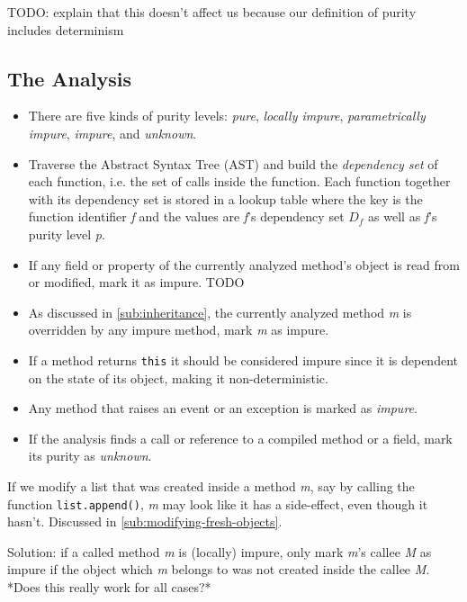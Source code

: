 \documentclass[a4paper,12pt]{article}
\begin{document}
TODO: explain that this doesn't affect us because our definition of purity includes determinism

\subsection{The Analysis} \label{sub:Analysis}
\begin{itemize}
  \item There are five kinds of purity levels: \textit{pure}, \textit{locally impure}, \textit{parametrically impure}, \textit{impure}, and \textit{unknown}.
  \item Traverse the Abstract Syntax Tree (AST) and build the \textit{dependency set} of each function, i.e. the set of calls inside the function.
    Each function together with its dependency set is stored in a lookup table where the key is the function identifier \textit{f} and the values are \textit{f}'s dependency set $D_f$ as well as \textit{f}'s purity level \textit{p}. %
  \item If any field or property of the currently analyzed method's object is read from or modified, mark it as impure. TODO
  \item As discussed in \autoref{sub:inheritance}, the currently analyzed method \textit{m} is overridden by any impure method, mark \textit{m} as impure.
  \item If a method returns \texttt{this} it should be considered impure since it is dependent on the state of its object, making it non-deterministic.
  \item Any method that raises an event or an exception is marked as \textit{impure}.
  \item If the analysis finds a call or reference to a compiled method or a field, mark its purity as \textit{unknown}.
\end{itemize}

If we modify a list that was created inside a method \textit{m}, say by calling the function \texttt{list.append()}, \textit{m} may look like it has a side-effect, even though it hasn't. Discussed in \autoref{sub:modifying-fresh-objects}.

Solution: if a called method \textit{m} is (locally) impure, only mark \textit{m}'s callee \textit{M} as impure if the object which \textit{m} belongs to was not created inside the callee \textit{M}. %
*Does this really work for all cases?*
\end{document}
